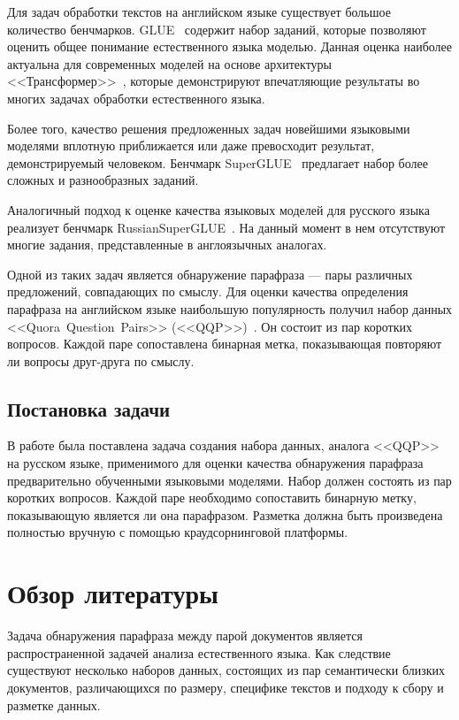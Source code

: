 \documentclass[a4paper,14pt]{extarticle}
\begin{document}
Для задач обработки текстов на английском языке существует большое количество бенчмарков.
\mbox{GLUE}~\autocite{wang2018glue} содержит набор заданий, которые позволяют оценить общее понимание естественного языка моделью.
Данная оценка наиболее актуальна для современных моделей на основе архитектуры <<Трансформер>>~\autocite{vaswani2017attention}, которые демонстрируют впечатляющие результаты во многих задачах обработки естественного языка.

Более того, качество решения предложенных задач новейшими языковыми моделями вплотную приближается или даже превосходит результат, демонстрируемый человеком.
Бенчмарк \mbox{SuperGLUE}~\autocite{wang2019superglue} предлагает набор более сложных и разнообразных заданий.

Аналогичный подход к оценке качества языковых моделей для русского языка реализует бенчмарк \mbox{RussianSuperGLUE}~\autocite{shavrina2020russiansuperglue}.
На данный момент в нем отсутствуют многие задания, представленные в англоязычных аналогах.

Одной из таких задач является обнаружение парафраза — пары различных предложений, совпадающих по смыслу.
Для оценки качества определения парафраза на английском языке наибольшую популярность получил набор данных \mbox{<<Quora Question Pairs>>} (\mbox{<<QQP>>})~\autocite{iyer_csernai_dandekar_2017}.
Он состоит из пар коротких вопросов. Каждой паре сопоставлена бинарная метка, показывающая повторяют ли вопросы друг-друга по смыслу.

\subsection{Постановка задачи}
В работе была поставлена задача создания набора данных, аналога \mbox{<<QQP>>} на русском языке, применимого для оценки качества обнаружения парафраза предварительно обученными языковыми моделями.
Набор должен состоять из пар коротких вопросов.
Каждой паре необходимо сопоставить бинарную метку, показывающую является ли она парафразом.
Разметка должна быть произведена полностью вручную с помощью краудсорнинговой платформы.

\section{Обзор литературы}
Задача обнаружения парафраза между парой документов является распространенной задачей анализа естественного языка.
Как следствие существуют несколько наборов данных, состоящих из пар семантически близких документов, различающихся по размеру, специфике текстов и подходу к сбору и разметке данных.
\end{document}
